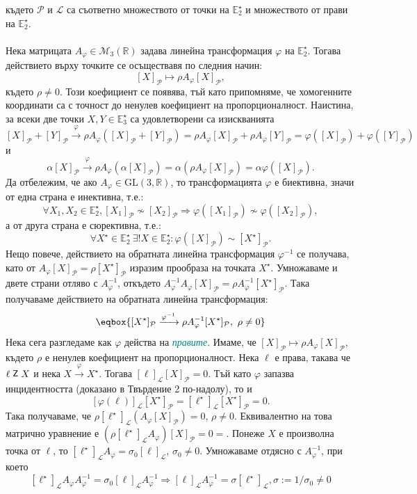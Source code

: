 \documentclass[12pt]{article}
\newcommand{\inc}{\mathrel{\raisebox{0.18ex}{\small$\mathsf{Z}$}}}
\begin{document}
където $\mathcal P$ и $\mathcal L$ са съответно множеството от точки на $\mathbb{E}_2^\star$ и множеството от прави на $\mathbb{E}_2^\star$.
\\
\\ Нека матрицата $A_\varphi\in\mathcal{M}_3(\mathbb{R})$ задава линейна трансформация $\varphi$ на $\mathbb{E}_2^\star$. Тогава действието върху точките се осъществавя по следния начин: $$[X]_{\mathcal P}\mapsto \rho A_{\varphi}[X]_{\mathcal P},$$
където $\rho\neq 0$. Този коефициент се появява, тъй като припомняме, че хомогенните координати са с точност до ненулев коефициент на пропорционалност. Наистина, за всеки две точки $X,Y\in\mathbb{E}_3^\star$ са удовлетворени са изискванията $$[X]_{\mathcal P}+[Y]_{\mathcal P}\xrightarrow{\varphi}\rho A_{\varphi}([X]_{\mathcal P}+[Y]_{\mathcal P})=\rho A_{\varphi}[X]_{\mathcal P}+\rho A_{\varphi}[Y]_{\mathcal P}=\varphi([X]_{\mathcal P})+\varphi([Y]_{\mathcal P})$$ и $$\alpha [X]_{\mathcal P}\xrightarrow{\varphi}\rho A_{\varphi}(\alpha [X]_{\mathcal P})=\alpha(\rho A_{\varphi}[X]_{\mathcal P})=\alpha\varphi([X]_{\mathcal P}).$$ Да отбележим, че ако $A_{\varphi}\in\mathrm{GL}(3,\mathbb{R})$, то трансформацията $\varphi$ е биективна, значи от една страна е инективна, т.е.: $$\forall X_1,X_2\in\mathbb{E}_2^\star, [X_1]_{\mathcal P}\not\sim [X_2]_{\mathcal P}\Rightarrow\varphi([X_1]_{\mathcal P})\not\sim\varphi([X_2]_{\mathcal P}),$$ а от друга страна е сюрективна, т.е.: $$\forall X^\star\in\mathbb{E}_2^\star\ \exists !X\in\mathbb{E}_2^\star:\varphi([X]_{\mathcal P})\sim [X^\star]_{\mathcal P}.$$ Нещо повече, действието на обратната линейна трансформация $\varphi^{-1}$ се получава, като от $A_{\varphi}[X]_{\mathcal P}=\rho [X^\star]_{\mathcal P}$ изразим прообраза на точката $X^\star$. Умножаваме и двете страни отляво с $A_{\varphi}^{-1}$, откъдето $A_{\varphi}^{-1}A_{\varphi}[X]_{\mathcal P}=\rho A_{\varphi}^{-1}[X^\star]_{\mathcal P}$. Така получаваме действието на обратната линейна трансформация: $$\eqbox{[X^\star]_{\mathcal P}\xrightarrow{\varphi^{-1}}\rho A_{\varphi}^{-1}[X^\star]_{\mathcal P},\ \rho\neq 0}$$
Нека сега разгледаме как $\varphi$ действа на \textit{\textcolor{teal}{правите}}. Имаме, че $[X]_{\mathcal P}\mapsto \rho A_{\varphi}[X]_{\mathcal P},$
където $\rho$ е ненулев коефициент на пропорционалност. Нека $\ell$ е права, такава че $\ell \inc X$ и нека $X\xrightarrow{\varphi}X^\star$. Тогава $[\ell]_{\mathcal L} [X]_{\mathcal P}=0$. Тъй като $\varphi$ запазва инцидентността (доказано в Твърдение 2 по-надолу), то и $$[\varphi(\ell)]_{\mathcal L}[X^\star]_{\mathcal P}=[\ell^\star]_{\mathcal L}[ X^\star]_{\mathcal P}=0.$$ Така получаваме, че $\rho[\ell^\star]_{\mathcal L}( A_{\varphi}[X]_{\mathcal{P}})=0$, $\rho\neq 0$. Еквивалентно на това матрично уравнение е $(\rho[\ell^\star]_{\mathcal L} A_{\varphi})[X]_{\mathcal P}=0=$. Понеже $X$ е произволна точка от $\ell$, то $[\ell^\star]_{\mathcal L} A_{\varphi}=\sigma_0[\ell]_{\mathcal L}$, $\sigma_0\neq 0$. Умножаваме отдясно с ${A}_{\varphi}^{-1}$, при което $$[\ell^\star]_{\mathcal L} A_{\varphi}{A}_{\varphi}^{-1}=\sigma_0[\ell]_{\mathcal L}{A}_{\varphi}^{-1}\Rightarrow [\ell]_{\mathcal L} A_{\varphi}^{-1}=\sigma [\ell^\star]_{\mathcal L}, \sigma:=1/\sigma_0\neq 0$$
\end{document}
